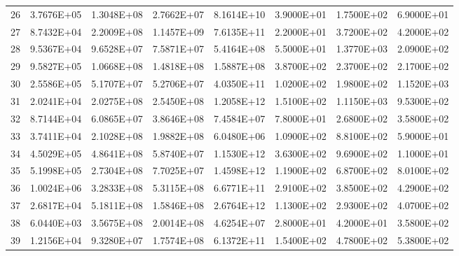 \documentclass[11pt]{scrartcl}
\theoremstyle{dotlessP}
\theoremstyle{dotlessN}
\theoremstyle{dotN}
\begin{document}
\begin{table}[H]
{\begin{tabular}{c|c|c|c|c|c|c|c}
26            & 3.7676E+05  & 1.3048E+08      & 2.7662E+07    & 8.1614E+10          & 3.9000E+01         & 1.7500E+02       & 6.9000E+01             \\
27            & 8.7432E+04  & 2.2009E+08      & 1.1457E+09    & 7.6135E+11          & 2.2000E+01         & 3.7200E+02       & 4.2000E+02             \\
28            & 9.5367E+04  & 9.6528E+07      & 7.5871E+07    & 5.4164E+08          & 5.5000E+01         & 1.3770E+03       & 2.0900E+02             \\
29            & 9.5827E+05  & 1.0668E+08      & 1.4818E+08    & 1.5887E+08          & 3.8700E+02         & 2.3700E+02       & 2.1700E+02             \\
30            & 2.5586E+05  & 5.1707E+07      & 5.2706E+07    & 4.0350E+11          & 1.0200E+02         & 1.9800E+02       & 1.1520E+03             \\
31            & 2.0241E+04  & 2.0275E+08      & 2.5450E+08    & 1.2058E+12          & 1.5100E+02         & 1.1150E+03       & 9.5300E+02             \\
32            & 8.7144E+04  & 6.0865E+07      & 3.8646E+08    & 7.4584E+07          & 7.8000E+01         & 2.6800E+02       & 3.5800E+02             \\
33            & 3.7411E+04  & 2.1028E+08      & 1.9882E+08    & 6.0480E+06          & 1.0900E+02         & 8.8100E+02       & 5.9000E+01             \\
34            & 4.5029E+05  & 4.8641E+08      & 5.8740E+07    & 1.1530E+12          & 3.6300E+02         & 9.6900E+02       & 1.1000E+01             \\
35            & 5.1998E+05  & 2.7304E+08      & 7.7025E+07    & 1.4598E+12          & 1.1900E+02         & 6.8700E+02       & 8.0100E+02             \\
36            & 1.0024E+06  & 3.2833E+08      & 5.3115E+08    & 6.6771E+11          & 2.9100E+02         & 3.8500E+02       & 4.2900E+02             \\
37            & 2.6817E+04  & 5.1811E+08      & 1.5846E+08    & 2.6764E+12          & 1.1300E+02         & 2.9300E+02       & 4.0700E+02             \\
38            & 6.0440E+03  & 3.5675E+08      & 2.0014E+08    & 4.6254E+07          & 2.8000E+01         & 4.2000E+01       & 3.5800E+02             \\
39            & 1.2156E+04  & 9.3280E+07      & 1.7574E+08    & 6.1372E+11          & 1.5400E+02         & 4.7800E+02       & 5.3800E+02             \\

\end{tabular}}
\end{table}
\end{document}

